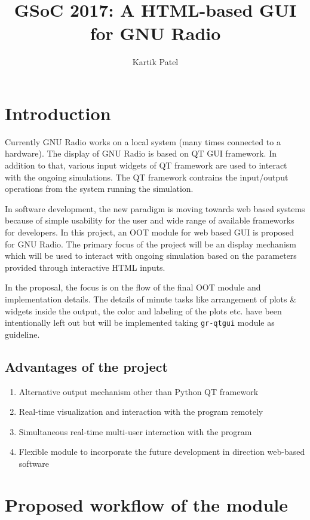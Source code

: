 \documentclass[a4paper, 11pt]{article}
\title{GSoC 2017: A HTML-based GUI for GNU Radio}
\author{Kartik Patel}
\begin{document}
\newcommand{\pull}[1]{\href{https://github.com/gnuradio/gnuradio/pull/#1}{\# #1}}



\maketitle

\section{Introduction}
Currently GNU Radio works on a local system (many times connected to a hardware). The display of GNU Radio is based on QT GUI framework. In addition to that, various input widgets of QT framework are used to interact with the ongoing simulations. The QT framework contrains the input/output operations from the system running the simulation.

In software development, the new paradigm is moving towards web based systems because of simple usability for the user and wide range of available frameworks for developers. In this project, an OOT module for web based GUI is proposed for GNU Radio. The primary focus of the project will be an display mechanism which will be used to interact with ongoing simulation based on the parameters provided through interactive HTML inputs.

In the proposal, the focus is on the flow of the final OOT module and implementation details. The details of minute tasks like arrangement of plots \& widgets inside the output, the color and labeling of the plots etc. have been intentionally left out but will be implemented taking \texttt{gr-qtgui} module as guideline.


\subsection{Advantages of the project}
\begin{enumerate}
\item Alternative output mechanism other than Python QT framework
\item Real-time visualization and interaction with the program remotely
\item Simultaneous real-time multi-user interaction with the program
\item Flexible module to incorporate the future development in direction web-based software
\end{enumerate}

\section{Proposed workflow of the module}
\end{document}
